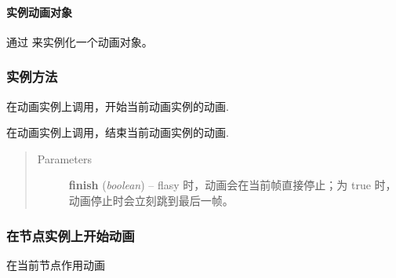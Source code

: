 \documentclass[letterpaper,10pt,english]{sphinxmanual}
\begin{document}
\paragraph{实例动画对象}
\label{api/core/anim/index:id4}
通过  来实例化一个动画对象。


\subsubsection{实例方法}
\label{api/core/anim/index:id5}

\begin{fulllineitems}
\label{api/core/anim/index:Anim.Anim.run}
在动画实例上调用，开始当前动画实例的动画.

\end{fulllineitems}



\begin{fulllineitems}
\label{api/core/anim/index:Anim.Anim.stop}
在动画实例上调用，结束当前动画实例的动画.
\begin{quote}\begin{description}
\item[{Parameters}] \leavevmode
\textbf{finish} (\emph{boolean}) -- flasy 时，动画会在当前帧直接停止；为 true 时，动画停止时会立刻跳到最后一帧。

\end{description}\end{quote}

\end{fulllineitems}



\subsubsection{在节点实例上开始动画}
\label{api/core/anim/index:id6}

\begin{fulllineitems}
\label{api/core/anim/index:Anim.Node.animate}
在当前节点作用动画

\end{fulllineitems}
\end{document}
